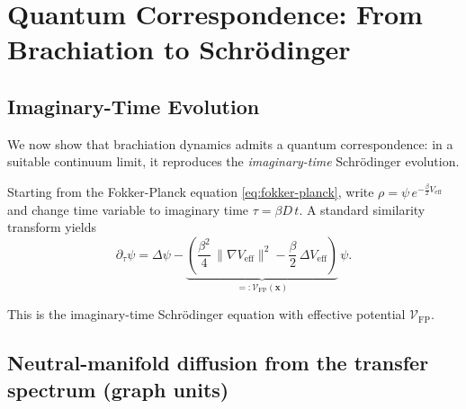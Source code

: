\documentclass[11pt]{article}
\theoremstyle{plain}
\theoremstyle{definition}
\begin{document}
\section{Quantum Correspondence: From Brachiation to Schrödinger}
\label{sec:quantum-correspondence}

\subsection{Imaginary-Time Evolution}

We now show that brachiation dynamics admits a quantum correspondence: in a suitable continuum limit, it reproduces the \emph{imaginary-time} Schrödinger evolution.

Starting from the Fokker-Planck equation \eqref{eq:fokker-planck}, write $\rho = \psi\,e^{-\frac{\beta}{2} V_{\mathrm{eff}}}$ and change time variable to imaginary time $\tau = \beta D\, t$. A standard similarity transform yields
\begin{equation}
  \partial_\tau \psi = \Delta \psi - \underbrace{\left(\frac{\beta^2}{4}\,\|\nabla V_{\mathrm{eff}}\|^2 - \frac{\beta}{2}\,\Delta V_{\mathrm{eff}}\right)}_{=:\mathcal{V}_{\mathrm{FP}}(\mathbf{x})}\, \psi.
  \label{eq:imag-time-FP}
\end{equation}

This is the imaginary-time Schrödinger equation with effective potential $\mathcal{V}_{\mathrm{FP}}$.


\subsection{Neutral-manifold diffusion from the transfer spectrum (graph units)}\label{subsec:neutral-diffusion-graph}
\end{document}
